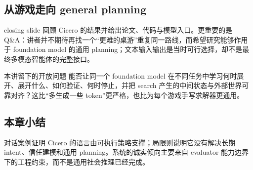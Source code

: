 \subsection{从游戏走向 general planning}

closing slide 回顾 Cicero 的结果并给出论文、代码与模型入口。更重要的是 Q\&A：讲者并不期待再找一个“更难的桌游”重复同一路线，而希望研究能够作用于 foundation model 的通用 planning；文本输入输出是当时可行选择，却不是最终多模态智能体的完整接口。



\begin{importantbox}{本讲留下的开放问题}
能否让同一个 foundation model 在不同任务中学习何时展开、展开什么、如何验证、何时停止，并把 search 产生的中间状态与外部世界可靠对齐？这比“多生成一些 token”更严格，也比为每个游戏手写求解器更通用。
\end{importantbox}

\subsection{本章小结}

对话案例证明 Cicero 的语言由可执行策略支撑；局限则说明它没有解决长期 intent、信任建模和通用 planning。系统的诚实倾向主要来自 evaluator 能力边界下的工程约束，而不是通用社会推理已经完成。

